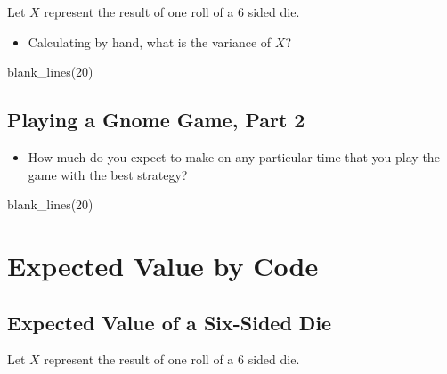 \documentclass[
]{book}
\newenvironment{Shaded}{\begin{snugshade}}{\end{snugshade}}
\newcommand{\DecValTok}[1]{\textcolor[rgb]{0.00,0.00,0.81}{#1}}
\newcommand{\FunctionTok}[1]{\textcolor[rgb]{0.00,0.00,0.00}{#1}}
\newcommand{\NormalTok}[1]{#1}
\providecommand{\tightlist}{%
  \setlength{\itemsep}{0pt}\setlength{\parskip}{0pt}}
\theoremstyle{definition}
\theoremstyle{definition}
\theoremstyle{definition}
\theoremstyle{definition}
\theoremstyle{remark}
\begin{document}
Let \(X\) represent the result of one roll of a 6 sided die.

\begin{itemize}
\tightlist
\item
  Calculating by hand, what is the variance of \(X\)?
\end{itemize}

\begin{Shaded}
\begin{Highlighting}[]
\FunctionTok{blank\_lines}\NormalTok{(}\DecValTok{20}\NormalTok{)}
\end{Highlighting}
\end{Shaded}

\vspace{20cm}

\hypertarget{playing-a-gnome-game-part-2}{%
\subsection{Playing a Gnome Game, Part 2}\label{playing-a-gnome-game-part-2}}

\begin{itemize}
\tightlist
\item
  How much do you expect to make on any particular time that you play the game with the best strategy?
\end{itemize}

\begin{Shaded}
\begin{Highlighting}[]
\FunctionTok{blank\_lines}\NormalTok{(}\DecValTok{20}\NormalTok{)}
\end{Highlighting}
\end{Shaded}

\vspace{20cm}

\hypertarget{expected-value-by-code}{%
\section{Expected Value by Code}\label{expected-value-by-code}}

\hypertarget{expected-value-of-a-six-sided-die}{%
\subsection{Expected Value of a Six-Sided Die}\label{expected-value-of-a-six-sided-die}}

Let \(X\) represent the result of one roll of a 6 sided die.
\end{document}
